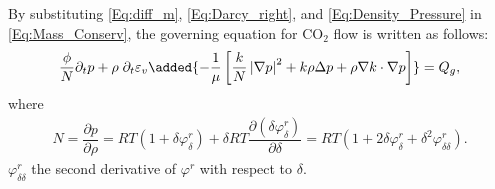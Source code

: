 By substituting \eqref{Eq:diff_m}, \eqref{Eq:Darcy_right}, and \eqref{Eq:Density_Pressure} in \eqref{Eq:Mass_Conserv}, the governing equation for CO$_2$ flow is written as follows: 
\begin{equation}\label{Eq:General_pressure}
\begin{aligned}
\frac{\phi}{{N}} \partial_t p +\rho \; \partial_t \varepsilon_v \added{-\frac{1}{\mu}\left[\frac{k}{N}\left|\nabla p\right|^2+k\rho\Delta p+\rho\nabla k\cdot \nabla p\right]}=Q_g,
\end{aligned}
\end{equation}
where
\begin{equation} \label{eq: derivative-P-rho}
\begin{split}
    {N} = \dfrac{\partial p}{\partial \rho}=  RT  \left(1+\delta \varphi^r_{\delta} \right)+  \delta RT  \dfrac{\partial\left(\delta \varphi^r_{\delta} \right)}{\partial \delta}
= RT\left(1+2\delta \varphi^r_{\delta}+\delta^2 \varphi^r_{\delta \delta} \right).
\end{split}
\end{equation}
 $\varphi^r_{\delta \delta}$  the  second derivative of $\varphi^r$ with respect to $\delta$.


